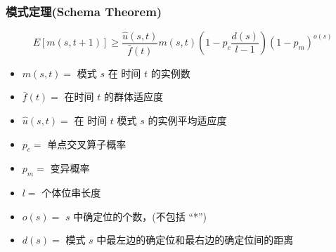 \documentclass{beamer}
\begin{document}
\begin{frame}
\frametitle{模式定理(Schema Theorem)}
\label{sec-5-4}


\[E[m(s,t+1)] \geq \frac{\hat{u}(s,t)}{\bar{f}(t)}m(s,t) \left(1 -
p_{c}\frac{d(s)}{l-1}\right) (1 - p_{m})^{o(s)} \]

\begin{itemize}
\item $m(s,t) =$  模式 $s$ 在 时间 $t$ 的实例数
\item $\bar{f}(t) =$ 在时间 $t$ 的群体适应度
\item $\hat{u}(s,t) =$  在 时间 $t$ 模式 $s$ 的实例平均适应度
\item $p_c =$ 单点交叉算子概率
\item $p_m =$ 变异概率
\item $l =$ 个体位串长度
\item $o(s)=$  $s$ 中确定位的个数，(不包括 ``*'')
\item $d(s) =$  模式 $s$ 中最左边的确定位和最右边的确定位间的距离
\end{itemize}
\end{frame}
\end{document}
